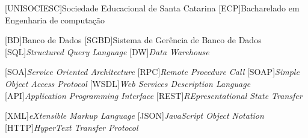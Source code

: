 
[UNISOCIESC]{Sociedade Educacional de Santa Catarina}
[ECP]{Bacharelado em Engenharia de computação}

[BD]{Banco de Dados}
[SGBD]{Sistema de Gerência de Banco de Dados}
[SQL]{\emph{Structured Query Language}}
[DW]{\emph{Data Warehouse}}

[SOA]{\emph{Service Oriented Architecture}}
[RPC]{\emph{Remote Procedure Call}}
[SOAP]{\emph{Simple Object Access Protocol}}
[WSDL]{\emph{Web Services Description Language}}
[API]{\emph{Application Programming Interface}}
[REST]{\emph{REpresentational State Transfer}}

[XML]{\emph{eXtensible Markup Language}}
[JSON]{\emph{JavaScript Object Notation}}
[HTTP]{\emph{HyperText Transfer Protocol}}
